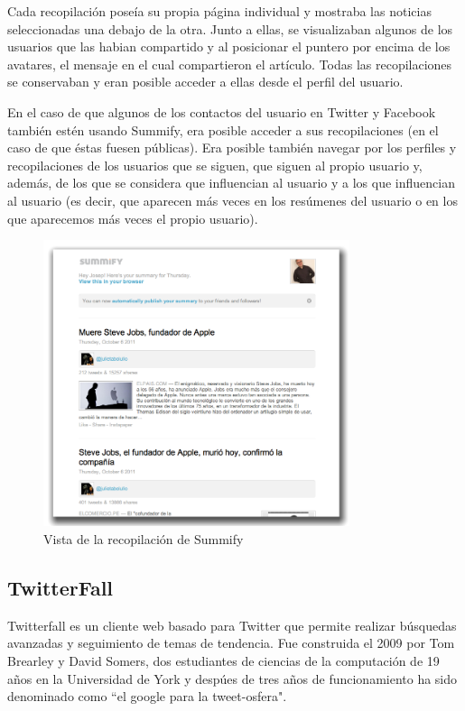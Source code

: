 Cada recopilación poseía su propia página individual y mostraba las noticias seleccionadas una debajo de la otra. Junto a ellas, se visualizaban algunos de los usuarios que las habian compartido y al posicionar el puntero por encima de los avatares, el mensaje en el cual compartieron el artículo. Todas las recopilaciones se conservaban y eran posible acceder a ellas desde el perfil del usuario.

En el caso de que algunos de los contactos del usuario en Twitter y Facebook también estén usando Summify, era posible acceder a sus recopilaciones (en el caso de que éstas fuesen públicas). Era posible también navegar por los perfiles y recopilaciones de los usuarios que se siguen, que siguen al propio usuario y, además, de los que se considera que influencian al usuario y a los que influencian al usuario (es decir, que aparecen más veces en los resúmenes del usuario o en los que aparecemos más veces el propio usuario).


\begin{figure}[H]
  \centering
    \includegraphics[width=0.8\textwidth]{imgs/summify.png}
  \caption{Vista de la recopilación de Summify}
  \label{fig:summify}
\end{figure}

\subsection{TwitterFall}

Twitterfall \cite{twitterfall} es un cliente web basado para Twitter que permite realizar búsquedas avanzadas y seguimiento de temas de tendencia. Fue construida el 2009 por Tom Brearley y David Somers, dos estudiantes de ciencias de la computación de 19 años en la Universidad de York y despúes de tres años de funcionamiento ha sido denominado como ``el google para la tweet-osfera".

